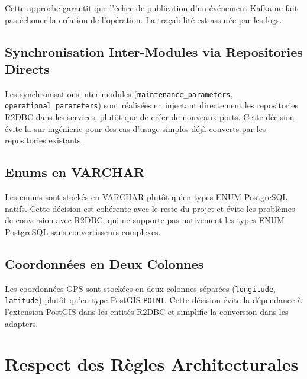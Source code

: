 \documentclass[12pt,a4paper]{report}
\begin{document}
Cette approche garantit que l'échec de publication d'un événement Kafka ne fait pas échouer la création de l'opération. La traçabilité est assurée par les logs.

\subsection{Synchronisation Inter-Modules via Repositories Directs}

Les synchronisations inter-modules (\texttt{maintenance\_parameters}, \texttt{operational\_parameters}) sont réalisées en injectant directement les repositories R2DBC dans les services, plutôt que de créer de nouveaux ports. Cette décision évite la sur-ingénierie pour des cas d'usage simples déjà couverts par les repositories existants.

\subsection{Enums en VARCHAR}

Les enums sont stockés en VARCHAR plutôt qu'en types ENUM PostgreSQL natifs. Cette décision est cohérente avec le reste du projet et évite les problèmes de conversion avec R2DBC, qui ne supporte pas nativement les types ENUM PostgreSQL sans convertisseurs complexes.

\subsection{Coordonnées en Deux Colonnes}

Les coordonnées GPS sont stockées en deux colonnes séparées (\texttt{longitude}, \texttt{latitude}) plutôt qu'en type PostGIS \texttt{POINT}. Cette décision évite la dépendance à l'extension PostGIS dans les entités R2DBC et simplifie la conversion dans les adapters.

\section{Respect des Règles Architecturales}
\end{document}
